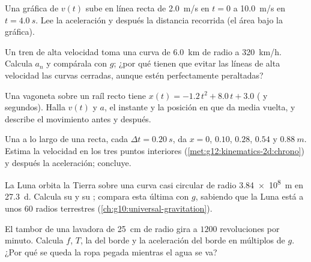 \begin{exercise}[$\star$]\label{exo:g12:kinematics-2d:5}
Una gráfica de $v(t)$ sube en línea recta de \qty{2.0}{m/s} en $t = 0$ a
\qty{10.0}{m/s} en $t = \qty{4.0}{s}$. Lee la aceleración y después la
distancia recorrida (el área bajo la gráfica).
\end{exercise}

\begin{exercise}[$\star\star$]\label{exo:g12:kinematics-2d:6}
Un tren de alta velocidad toma una curva de \qty{6.0}{km} de radio a
\qty{320}{km/h}. Calcula $a_n$ y compárala con $g$; ¿por qué tienen que
evitar las líneas de alta velocidad las curvas cerradas, aunque estén
perfectamente peraltadas?
\end{exercise}

\begin{exercise}[$\star\star$]\label{exo:g12:kinematics-2d:7}
Una vagoneta sobre un raíl recto tiene
$x(t) = -1.2\,t^2 + 8.0\,t + 3.0$ ( y segundos). Halla $v(t)$ y
$a$, el instante y la posición en que da media vuelta, y describe el
movimiento antes y después.
\end{exercise}

\begin{exercise}[$\star\star$]\label{exo:g12:kinematics-2d:8}
Una  a lo largo de una recta, cada
$\Delta t = \qty{0.20}{s}$, da $x = 0$, $0.10$, $0.28$, $0.54$ y
$\qty{0.88}{m}$. Estima la velocidad en los tres puntos interiores
(\cref{met:g12:kinematics-2d:chrono}) y después la aceleración;
concluye.
\end{exercise}

\begin{exercise}[$\star\star$]\label{exo:g12:kinematics-2d:9}
La Luna orbita la Tierra sobre una curva casi circular de radio
\qty{3.84e8}{m} en \qty{27.3}{d}. Calcula su  y su ; compara esta última con $g$, sabiendo que la Luna está a
unos $60$ radios terrestres (\cref{ch:g10:universal-gravitation}).
\end{exercise}

\begin{exercise}[$\star\star$]\label{exo:g12:kinematics-2d:10}
El tambor de una lavadora de \qty{25}{cm} de radio gira a $1200$
revoluciones por minuto. Calcula $f$, $T$, la  del borde y la
aceleración del borde en múltiplos de $g$. ¿Por qué se queda la ropa
pegada mientras el agua se va?
\end{exercise}

